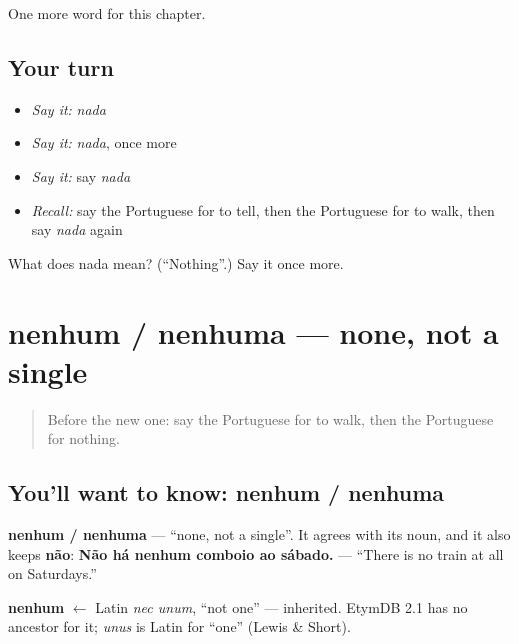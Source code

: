 \begin{grammarlens}[title={What you've built}]
One more word for this chapter.
\end{grammarlens}

\subsection*{Your turn}
\begin{itemize}
\raggedright
  \item \emph{Say it:} \emph{nada}
  \item \emph{Say it:} \emph{nada}, once more
  \item \emph{Say it:} say \emph{nada}
  \item \emph{Recall:} say the Portuguese for to tell, then the Portuguese for to walk, then say \emph{nada} again
\end{itemize}

\begin{tcolorbox}[breakable,colback=teal!4,colframe=teal!35!black,title={Before you move on}]
What does nada mean? (\textquotedblleft{}Nothing\textquotedblright{}.) Say it once more.
\end{tcolorbox}
\section[nenhum / nenhuma]{nenhum / nenhuma — none, not a single}

\label{lesson:PT-C134-nenhum}



\begin{quote}
Before the new one: say the Portuguese for to walk, then the Portuguese for nothing.
\end{quote}

\subsection*{You'll want to know: nenhum / nenhuma}
\textbf{nenhum / nenhuma} — \textquotedblleft{}none, not a single\textquotedblright{}. It agrees with its noun, and it also keeps \textbf{não}: \textbf{Não há nenhum comboio ao sábado.} — \textquotedblleft{}There is no train at all on Saturdays.\textquotedblright{}

\begin{cousinweb}
\textbf{nenhum} $\leftarrow$ Latin \emph{nec unum}, \textquotedblleft{}not one\textquotedblright{} — inherited. EtymDB 2.1 has no ancestor for it; \emph{unus} is Latin for \textquotedblleft{}one\textquotedblright{} (Lewis \& Short).
\end{cousinweb}

